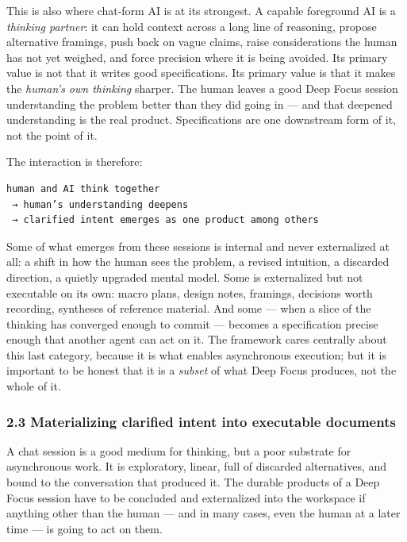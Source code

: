 \documentclass[
  nonatbib,
  preprint]{article}
\begin{document}
This is also where chat-form AI is at its strongest. A capable
foreground AI is a \emph{thinking partner}: it can hold context across a
long line of reasoning, propose alternative framings, push back on vague
claims, raise considerations the human has not yet weighed, and force
precision where it is being avoided. Its primary value is not that it
writes good specifications. Its primary value is that it makes the
\emph{human's own thinking} sharper. The human leaves a good Deep Focus
session understanding the problem better than they did going in --- and
that deepened understanding is the real product. Specifications are one
downstream form of it, not the point of it.

The interaction is therefore:

\begin{verbatim}
human and AI think together
 → human’s understanding deepens
 → clarified intent emerges as one product among others
\end{verbatim}

Some of what emerges from these sessions is internal and never
externalized at all: a shift in how the human sees the problem, a
revised intuition, a discarded direction, a quietly upgraded mental
model. Some is externalized but not executable on its own: macro plans,
design notes, framings, decisions worth recording, syntheses of
reference material. And some --- when a slice of the thinking has
converged enough to commit --- becomes a specification precise enough
that another agent can act on it. The framework cares centrally about
this last category, because it is what enables asynchronous execution;
but it is important to be honest that it is a \emph{subset} of what Deep
Focus produces, not the whole of it.

\subsubsection{\texorpdfstring{\textbf{2.3 Materializing clarified
intent into executable
documents}}{2.3 Materializing clarified intent into executable documents}}\label{materializing-clarified-intent-into-executable-documents}

A chat session is a good medium for thinking, but a poor substrate for
asynchronous work. It is exploratory, linear, full of discarded
alternatives, and bound to the conversation that produced it. The
durable products of a Deep Focus session have to be concluded and
externalized into the workspace if anything other than the human --- and
in many cases, even the human at a later time --- is going to act on
them.
\end{document}
